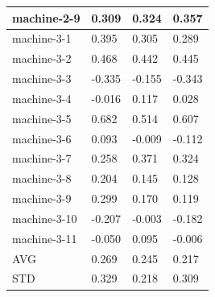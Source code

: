 \begin{table}[]
{\begin{tabular}{|l|l|l|l|}
machine-2-9     & 0.309                                  & 0.324                                 & 0.357                         \\ \hline
machine-3-1     & 0.395                                  & 0.305                                 & 0.289                         \\ \hline
machine-3-2     & 0.468                                  & 0.442                                 & 0.445                         \\ \hline
machine-3-3     & -0.335                                 & -0.155                                & -0.343                        \\ \hline
machine-3-4     & -0.016                                 & 0.117                                 & 0.028                         \\ \hline
machine-3-5     & 0.682                                  & 0.514                                 & 0.607                         \\ \hline
machine-3-6     & 0.093                                  & -0.009                                & -0.112                        \\ \hline
machine-3-7     & 0.258                                  & 0.371                                 & 0.324                         \\ \hline
machine-3-8     & 0.204                                  & 0.145                                 & 0.128                         \\ \hline
machine-3-9     & 0.299                                  & 0.170                                 & 0.119                         \\ \hline
machine-3-10    & -0.207                                 & -0.003                                & -0.182                        \\ \hline
machine-3-11    & -0.050                                 & 0.095                                 & -0.006                        \\ \hline
AVG             & 0.269                                  & 0.245                                 & 0.217                         \\ \hline
STD             & 0.329                                  & 0.218                                 & 0.309                         \\ \hline
\end{tabular}%
}
\end{table}


